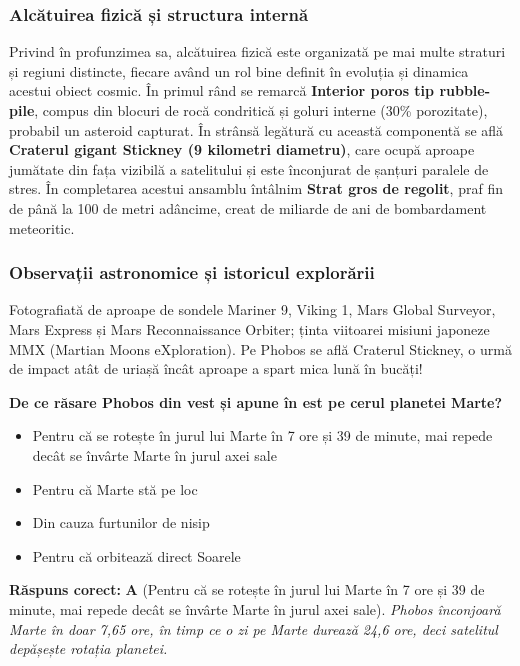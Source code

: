 \subsubsection*{Alcătuirea fizică și structura internă}
Privind în profunzimea sa, alcătuirea fizică este organizată pe mai multe straturi și regiuni distincte, fiecare având un rol bine definit în evoluția și dinamica acestui obiect cosmic. În primul rând se remarcă \textbf{Interior poros tip \guillemotleft{}rubble-pile\guillemotright{}}, compus din blocuri de rocă condritică și goluri interne (30\% porozitate), probabil un asteroid capturat. În strânsă legătură cu această componentă se află \textbf{Craterul gigant Stickney (9 kilometri diametru)}, care ocupă aproape jumătate din fața vizibilă a satelitului și este înconjurat de șanțuri paralele de stres. În completarea acestui ansamblu întâlnim \textbf{Strat gros de regolit}, praf fin de până la 100 de metri adâncime, creat de miliarde de ani de bombardament meteoritic.

\subsubsection*{Observații astronomice și istoricul explorării}
Fotografiată de aproape de sondele Mariner 9, Viking 1, Mars Global Surveyor, Mars Express și Mars Reconnaissance Orbiter; ținta viitoarei misiuni japoneze MMX (Martian Moons eXploration). Pe Phobos se află Craterul Stickney, o urmă de impact atât de uriașă încât aproape a spart mica lună în bucăți!

\vspace{6pt}
\begin{tcolorbox}[orbitarquiz, title={\textbf{Întrebare de verificare \#7: Phobos}}]
\textbf{De ce răsare Phobos din vest și apune în est pe cerul planetei Marte?}
\begin{itemize}[leftmargin=2.2em, itemsep=2pt, topsep=4pt]
  \item[$\square$ \textbf{A.}] Pentru că se rotește în jurul lui Marte în 7 ore și 39 de minute, mai repede decât se învârte Marte în jurul axei sale
  \item[$\square$ \textbf{B.}] Pentru că Marte stă pe loc
  \item[$\square$ \textbf{C.}] Din cauza furtunilor de nisip
  \item[$\square$ \textbf{D.}] Pentru că orbitează direct Soarele
\end{itemize}
\vspace{2pt}
{\footnotesize\color{orbitarMuted}\textbf{Răspuns corect:} \textbf{A} (Pentru că se rotește în jurul lui Marte în 7 ore și 39 de minute, mai repede decât se învârte Marte în jurul axei sale). \emph{Phobos înconjoară Marte în doar 7,65 ore, în timp ce o zi pe Marte durează 24,6 ore, deci satelitul depășește rotația planetei.}}
\end{tcolorbox}
\clearpage


